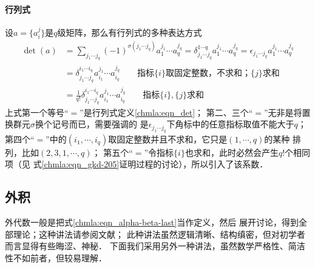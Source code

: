 \paragraph{行列式}
设$a=\{a_i^j\}$是$q$级矩阵，那么有行列式的多种表达方式 %
\setlength{\mathindent}{0em}
\begin{equation}\label{chmla:eqn_gkd-305}
\begin{aligned}
    \det (a) &= \sum_{j_1 \cdots j_q} (-1)^{\sigma(j_1  \cdots j_q)}
    a_{1}^{j_1} \cdots a_{q}^{j_q}
    = \delta_{j_1 \cdots j_q}^{1 \cdots q}  a^{j_1}_{1} \cdots a^{j_q}_{q}
    = \epsilon_{j_1 \cdots j_q} a^{j_1}_{1} \cdots a^{j_q}_{q} \\
    &= \delta_{j_1 \cdots j_q}^{i_1 \cdots i_q}  a^{j_1}_{i_1} \cdots a^{j_q}_{i_q}
       \qquad \text{指标$\{i\}$取固定整数，不求和；$\{j\}$求和} \\
    &= \frac{1}{q!} \delta_{j_1 \cdots j_q}^{i_1 \cdots i_q} a_{i_1}^{j_1} \cdots a_{i_q}^{j_q}
       \qquad \text{指标$\{i\},\{j\}$求和}
\end{aligned}
\end{equation}\setlength{\mathindent}{2em}
上式第一个等号“$=$”是行列式定义\eqref{chmla:eqn_det}； 
第二、三个“$=$”无非是将置换群元$\sigma$换个记号而已，需要强调的
是$\epsilon_{j_1 \cdots j_q}$下角标中的任意指标取值不能大于$q$；
第四个“$=$”中的$(i_1,\cdots,i_q)$取固定整数并且不求和，它只是$(1,\cdots,q)$的某种
排列，比如$(2,3,1,\cdots,q)$；
第五个“$=$”令指标$\{i\}$也求和，此时必然会产生$q!$个相同项（见
式\eqref{chmla:eqn_gkd-205}证明过程的讨论），所以引入了该系数．




\subsection{外积}\label{chmla:sec_exterior-product}
外代数一般是把式\eqref{chmla:eqn_alpha-beta-last}当作定义，然后
展开讨论，得到全部理论；这种讲法请参阅文献\parencite[\S 2.3]{cc2001-zh}；
此种讲法虽然逻辑清晰、结构缜密，但对初学者而言显得有些晦涩、神秘．
下面我们采用另外一种讲法，虽然数学严格性、简洁性不如前者，但较易理解．

